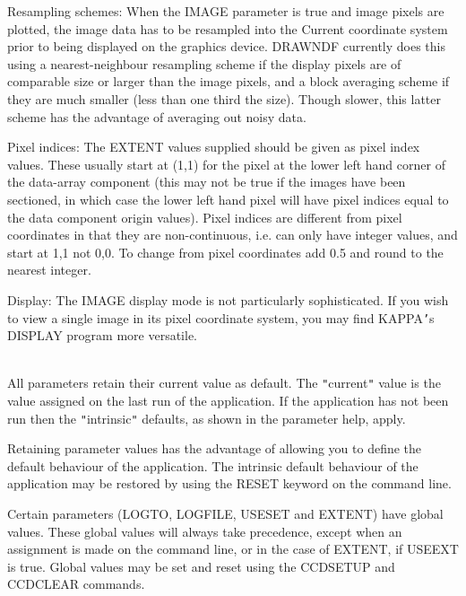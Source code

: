 \documentclass[twoside,11pt]{article}
\newcommand{\htmlref}[2]{#1}
\newcommand{\xref}[3]{#1}
\renewcommand{\_}{\texttt{\symbol{95}}}
\newcommand{\xroutine}[1]{\htmlref{{\sc #1}}{#1}}
\newcommand{\sstdiytopic}[2]{\item[#1:] \mbox{} \\[1.3ex] #2}
\newcommand{\sstitem}{\item}
\newcommand{\sstdiytopic}[2]{\item[{#1}] #2 }
\newcommand{\sstitem}{\item}
\begin{document}
{{{         \sstitem
         Resampling schemes:
            When the IMAGE parameter is true and image pixels are plotted,
            the image data has to be resampled into the Current coordinate
            system prior to being displayed on the graphics device.
            DRAWNDF currently does this using a nearest-neighbour
            resampling scheme if the display pixels are of comparable
            size or larger than the image pixels, and a block averaging
            scheme if they are much smaller (less than one third the size).
            Though slower, this latter scheme has the advantage of
            averaging out noisy data.

         \sstitem
         Pixel indices:
            The EXTENT values supplied should be given as pixel index values.
            These usually start at (1,1) for the pixel at the lower left
            hand corner of the data-array component (this may
            not be true if the images have been sectioned, in which case the
            lower left hand pixel will have pixel indices equal to the data
            component origin values). Pixel indices are different from
            pixel coordinates in that they are non-continuous, i.e. can
            only have integer values, and start at 1,1 not 0,0. To change
            from pixel coordinates add 0.5 and round to the nearest integer.

         \sstitem
         Display:
            The IMAGE display mode is not particularly sophisticated.
            If you wish to view a single image in its pixel coordinate
            system, you may find KAPPA{\tt '}s \xref{DISPLAY}{sun95}{DISPLAY} program more versatile.
      }
   }
   \sstdiytopic{
      Behaviour of Parameters
   }{
      All parameters retain their current value as default. The
      {\tt "}current{\tt "} value is the value assigned on the last run of the
      application. If the application has not been run then the
      {\tt "}intrinsic{\tt "} defaults, as shown in the parameter help, apply.

      Retaining parameter values has the advantage of allowing you to
      define the default behaviour of the application. The intrinsic
      default behaviour of the application may be restored by using the
      RESET keyword on the command line.

      Certain parameters (LOGTO, LOGFILE, USESET and EXTENT) have global
      values. These global values will always take precedence, except
      when an assignment is made on the command line, or in the case
      of EXTENT, if USEEXT is true. Global values may be set and
      reset using the \xroutine{CCDSETUP} and \xroutine{CCDCLEAR} commands.

}}
\end{document}
